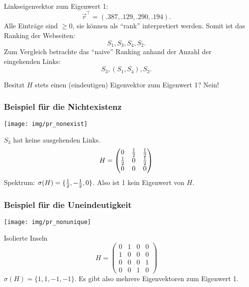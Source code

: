 Linkseigenvektor zum Eigenwert 1:
\[ \vec{r}^\top = (\num{.387}, \num{.129}, \num{.290}, \num{.194}). \]
Alle Einträge sind $\ge 0$, sie können als ``rank'' interpretiert werden. Somit
ist das Ranking der Webseiten:
\[ S_1, S_3, S_4, S_2. \]
Zum Vergleich betrachte das ``naive'' Ranking anhand der Anzahl der eingehenden
Links:
\[ S_3, (S_1, S_4), S_2. \]

Besitzt $H$ stets einen (eindeutigen) Eigenvektor zum Eigenwert 1? Nein!

\subsubsection*{Beispiel für die Nichtexistenz}
\begin{center}
  \begin{minipage}{5cm}
    \texttt{[image: img/pr\_nonexist]}
  \end{minipage}
  \begin{minipage}{9cm}
    $S_3$ hat keine ausgehenden Links.
    \[ H = \begin{pmatrix}
        0 & \frac{1}{2} & \frac{1}{2} \\
        \frac{1}{2} & 0 & \frac{1}{2} \\
        0 & 0 & 0
      \end{pmatrix}
    \]
    Spektrum: $\sigma(H) = \{ \frac{1}{2}, -\frac{1}{2}, 0 \}$. Also ist 1 kein Eigenwert
    von $H$.
  \end{minipage}
\end{center}

\subsubsection*{Beispiel für die Uneindeutigkeit}
\begin{center}
  \begin{minipage}{5cm}
    \texttt{[image: img/pr\_nonunique]}
  \end{minipage}
  \begin{minipage}{9cm}
    Isolierte Inseln
    \[ H = \begin{pmatrix}
        0 & 1 & 0 & 0 \\
        1 & 0 & 0 & 0 \\
        0 & 0 & 0 & 1 \\
        0 & 0 & 1 & 0 
      \end{pmatrix}
    \]
    $\sigma(H) = \{1, 1, -1, -1\}$. Es gibt also mehrere Eigenvektoren zum
    Eigenwert 1.
  \end{minipage}
\end{center}

